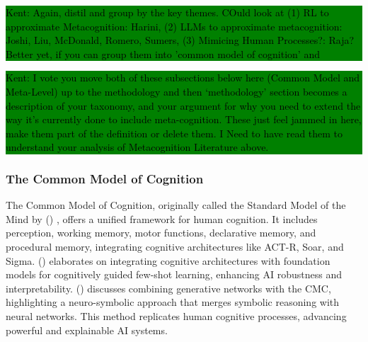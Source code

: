 \documentclass[hf]{ceurart}
\newcommand{\citeauthornum}[1]{\citeauthor{#1} (\citeyear{#1}) \cite{#1}}
\newcommand{\pinaforecomment}[4]{\colorbox{#1}{\textcolor{#4}{\parbox{.8\linewidth}{#2: #3}}}}
\newcommand{\osullikomment}[1]{\pinaforecomment{green}{Kent}{#1}{black}}
\begin{document}
\osullikomment{Again, distil and group by the key themes. COuld look at (1) RL to approximate Metacognition: Harini, (2) LLMs to approximate metacognition: Joshi, Liu, McDonald, Romero, Sumers, (3) Mimicing Human Processes?: Raja? Better yet, if you can group them into 'common model of cognition' and }

\osullikomment{I vote you move both of these subsections below here (Common Model and Meta-Level) up to the methodology and then `methodology' section becomes a description of your taxonomy, and your argument for why you need to extend the way it's currently done to include meta-cognition. These just feel jammed in here, make them part of the definition or delete them. I Need to have read them to understand your analysis of Metacognition Literature above.}

\subsubsection{The Common Model of Cognition}
The Common Model of Cognition, originally called the Standard Model of the Mind by \citeauthornum{Laird2017}, offers a unified framework for human cognition. It includes perception, working memory, motor functions, declarative memory, and procedural memory, integrating cognitive architectures like ACT-R, Soar, and Sigma. \citeauthornum{Thomson2024} elaborates on integrating cognitive architectures with foundation models for cognitively guided few-shot learning, enhancing AI robustness and interpretability. \citeauthornum{West2024} discusses combining generative networks with the CMC, highlighting a neuro-symbolic approach that merges symbolic reasoning with neural networks. This method replicates human cognitive processes, advancing powerful and explainable AI systems.
\end{document}
